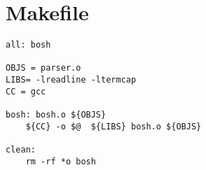 \chapter{Makefile}
\begin{lstlisting}
all: bosh

OBJS = parser.o
LIBS= -lreadline -ltermcap
CC = gcc

bosh: bosh.o ${OBJS}
	${CC} -o $@  ${LIBS} bosh.o ${OBJS}

clean:
	rm -rf *o bosh
\end{lstlisting}